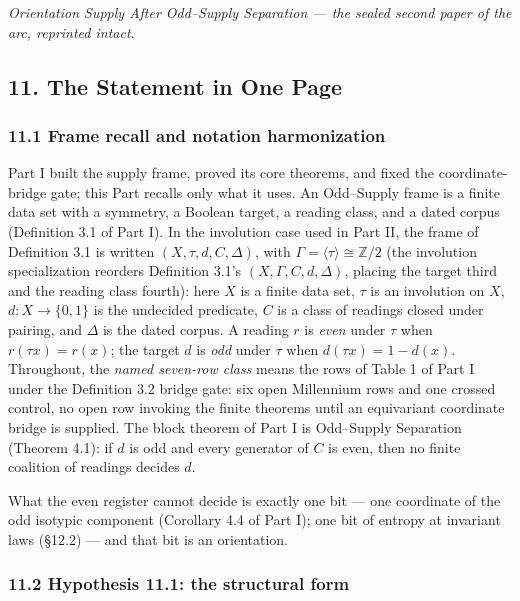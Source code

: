\documentclass[10pt,twocolumn]{article}
\begin{document}
\emph{Orientation Supply After Odd--Supply Separation --- the sealed
second paper of the arc, reprinted intact.}

\subsection{11. The Statement in One
Page}\label{the-statement-in-one-page}

\subsubsection{11.1 Frame recall and notation
harmonization}\label{frame-recall-and-notation-harmonization}

Part I built the supply frame, proved its core theorems, and fixed the
coordinate-bridge gate; this Part recalls only what it uses. An
Odd--Supply frame is a finite data set with a symmetry, a Boolean
target, a reading class, and a dated corpus (Definition 3.1 of Part I).
In the involution case used in Part II, the frame of Definition 3.1 is
written \((X, \tau, d, C, \Delta)\), with
\(\Gamma = \langle\tau\rangle \cong \mathbb{Z}/2\) (the involution
specialization reorders Definition 3.1's \((X, \Gamma, C, d, \Delta)\),
placing the target third and the reading class fourth): here \(X\) is a
finite data set, \(\tau\) is an involution on \(X\),
\(d : X \to \{0,1\}\) is the undecided predicate, \(C\) is a class of
readings closed under pairing, and \(\Delta\) is the dated corpus. A
reading \(r\) is \emph{even} under \(\tau\) when \(r(\tau x) = r(x)\);
the target \(d\) is \emph{odd} under \(\tau\) when
\(d(\tau x) = 1 - d(x)\). Throughout, the \emph{named seven-row class}
means the rows of Table 1 of Part I under the Definition 3.2 bridge
gate: six open Millennium rows and one crossed control, no open row
invoking the finite theorems until an equivariant coordinate bridge is
supplied. The block theorem of Part I is Odd--Supply Separation (Theorem
4.1): if \(d\) is odd and every generator of \(C\) is even, then no
finite coalition of readings decides \(d\).

What the even register cannot decide is exactly one bit --- one
coordinate of the odd isotypic component (Corollary 4.4 of Part I); one
bit of entropy at invariant laws (§12.2) --- and that bit is an
orientation.

\subsubsection{11.2 Hypothesis 11.1: the structural
form}\label{hypothesis-11.1-the-structural-form}
\end{document}
